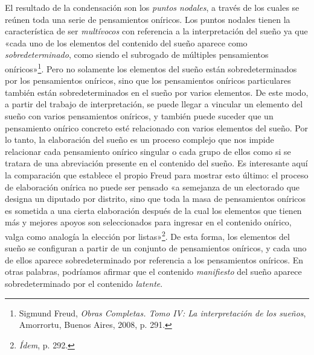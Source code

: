 El resultado de la condensación son los \emph{puntos nodales}, a través de los cuales se reúnen toda una serie de pensamientos oníricos. Los puntos nodales tienen la característica de ser \emph{multívocos} con referencia a la interpretación del sueño ya que «cada uno de los elementos del contenido del sueño aparece como \emph{sobredeterminado}, como siendo el subrogado de múltiples pensamientos oníricos»\footnote{Sigmund Freud, \emph{Obras Completas. Tomo IV: La interpretación de los sueños}, Amorrortu, Buenos Aires, 2008, p. 291.}. Pero no solamente los elementos del sueño están sobredeterminados por los pensamientos oníricos, sino que los pensamientos oníricos particulares también están sobredeterminados en el sueño por varios elementos. De este modo, a partir del trabajo de interpretación, se puede llegar a vincular un elemento del sueño con varios pensamientos oníricos, y también puede suceder que un pensamiento onírico concreto esté relacionado con varios elementos del sueño. Por lo tanto, la elaboración del sueño es un proceso complejo que nos impide relacionar cada pensamiento onírico singular o cada grupo de ellos como si se tratara de una abreviación presente en el contenido del sueño. Es interesante aquí la comparación que establece el propio Freud para mostrar esto último: el proceso de elaboración onírica no puede ser pensado «a semejanza de un electorado que designa un diputado por distrito, sino que toda la masa de pensamientos oníricos es sometida a una cierta elaboración después de la cual los elementos que tienen más y mejores apoyos son seleccionados para ingresar en el contenido onírico, valga como analogía la elección por listas»\footnote{\emph{Ídem}, p. 292.}. De esta forma, los elementos del sueño se configuran a partir de un conjunto de pensamientos oníricos, y cada uno de ellos aparece sobredeterminado por referencia a los pensamientos oníricos. En otras palabras, podríamos afirmar que el contenido \emph{manifiesto} del sueño aparece sobredeterminado por el contenido \emph{latente}.

